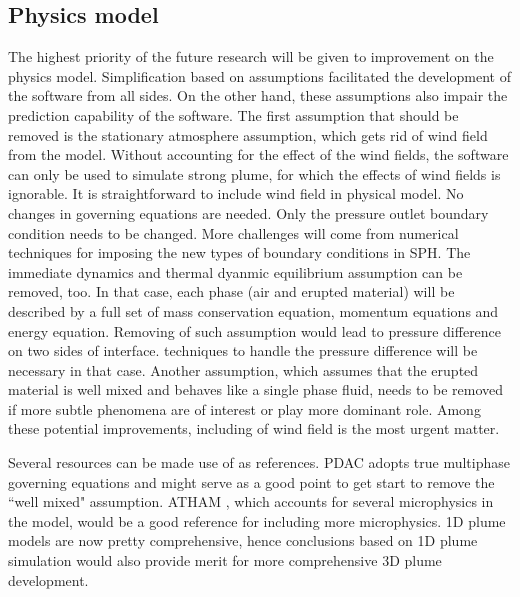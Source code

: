 \subsection{Physics model}
The highest priority of the future research will be given to improvement on the physics model. Simplification based on assumptions facilitated the development of the software from all sides. On the other hand, these assumptions also impair the prediction capability of the software. The first assumption that should be removed is the stationary atmosphere assumption, which gets rid of wind field from the model. Without accounting for the effect of the wind fields, the software can only be used to simulate strong plume, for which the effects of wind fields is ignorable. It is straightforward to include wind field in physical model. No changes in governing equations are needed. Only the pressure outlet boundary condition needs to be changed. More challenges will come from numerical techniques for imposing the new types of boundary conditions in SPH. 
The immediate dynamics and thermal dyanmic equilibrium assumption can be removed, too. In that case, each phase (air and erupted material) will be described by a full set of mass conservation equation, momentum equations and energy equation. Removing of such assumption would lead to pressure difference on two sides of interface. techniques to handle the pressure difference will be necessary in that case. Another assumption, which assumes that the erupted material is well mixed and behaves like a single phase fluid, needs to be removed if more subtle phenomena are of interest or play more dominant role. Among these potential improvements, including of wind field is the most urgent matter.

Several resources can be made use of as references. PDAC\citep{neri2003multiparticle} adopts true multiphase governing equations and might serve as a good point to get start to remove the ``well mixed" assumption. ATHAM  \citep{oberhuber1998volcanic}, which accounts for several microphysics in the model, would be a good reference for including more microphysics. 1D plume models \citep{bursik2001effect, pouget2016sensitivity, folch2016fplume} are now pretty comprehensive, hence conclusions based on 1D plume simulation would also provide merit for more comprehensive 3D plume development.

